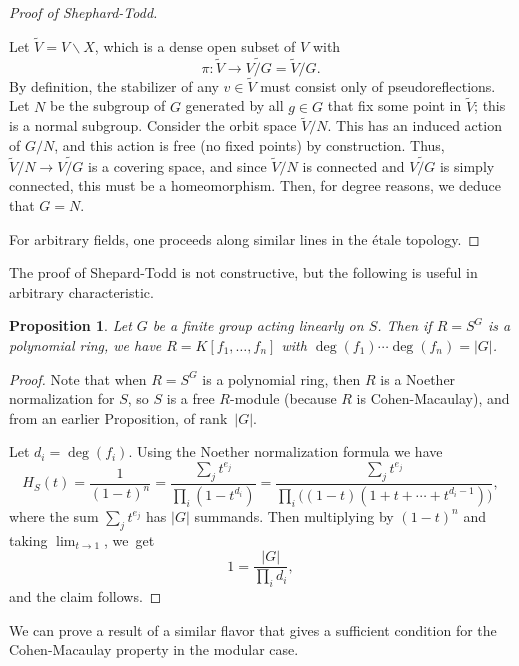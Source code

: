 \documentclass[12pt]{amsart}
\newtheorem{proposition}[theorem]{Proposition}
\theoremstyle{definition}
\numberwithin{equation}{theorem}
\def\to{\longrightarrow}
\begin{document}
\begin{proof}[Proof of Shephard-Todd]
\begin{asparaenum}
Let $\widetilde{V} = V \smallsetminus X$, which is a dense open subset of $V$ with 
\[ \pi : \widetilde{V} \to \widetilde{V/G}=\widetilde{V}/G.\]
By definition, the stabilizer of any $v\in \widetilde{V}$ must consist only of pseudoreflections.
Let $N$ be the subgroup of $G$ generated by all $g\in G$ that fix some point in $\widetilde{V}$; this is a normal subgroup. Consider the orbit space $\widetilde{V}/N$. This has an induced action of $G/N$, and this action is free (no fixed points) by construction. Thus, $\widetilde{V}/N \to \widetilde{V/G}$ is a covering space, and since $\widetilde{V}/N$ is connected and $\widetilde{V/G}$ is simply connected, this must be a homeomorphism. Then, for degree reasons, we deduce that $G=N$.
\end{asparaenum}

For arbitrary fields, one proceeds along similar lines in the \'etale topology.
\end{proof}

The proof of Shepard-Todd is not constructive, but the following is useful in arbitrary characteristic.



\begin{proposition} Let $G$ be a finite group acting linearly on $S$. Then if $R=S^G$ is a polynomial ring, we have $R=K[f_1,\dots,f_n]$ with $\deg(f_1) \cdots \deg(f_n) = |G|$.
\end{proposition}
\begin{proof}
Note that when $R=S^G$ is a polynomial ring, then $R$ is a Noether normalization for $S$, so $S$ is a free $R$-module (because $R$ is Cohen-Macaulay), and from an earlier Proposition, of rank~$|G|$. 

Let $d_i =\deg(f_i)$. Using the Noether normalization formula we have
\[ H_S(t) = \frac{1}{(1-t)^n}  = \frac{\sum_j t^{e_j} }{\prod_i (1-t^{d_i})} = \frac{\sum_j t^{e_j} }{\prod_i \big((1-t)(1 + t + \cdots + t^{d_i-1})\big)},\]
where the sum $\sum_j t^{e_j}$ has $|G|$ summands. Then multiplying by $(1-t)^n$ and taking $\lim_{t \to 1}$, we~get
\[ 1 = \frac{|G|}{\prod_i d_i},\]
and the claim follows.
\end{proof}

We can prove a result of a similar flavor that gives a sufficient condition for the Cohen-Macaulay property in the modular case.
\end{document}
